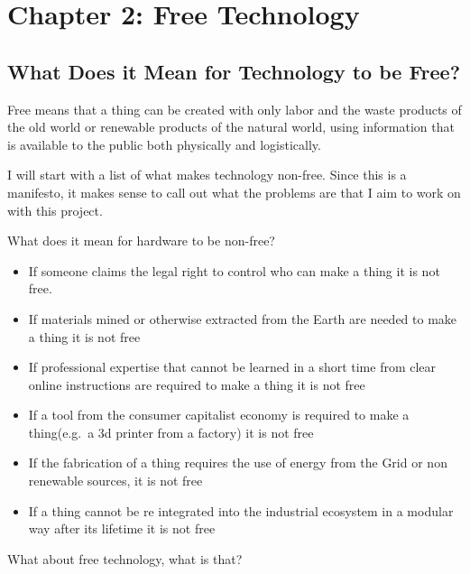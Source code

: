 \section{Chapter 2: Free Technology}\label{chapter-2-free-technology}

\subsection{What Does it Mean for Technology to be
Free?}\label{what-does-it-mean-for-technology-to-be-free}

Free means that a thing can be created with only labor and the waste
products of the old world or renewable products of the natural world,
using information that is available to the public both physically and
logistically.

I will start with a list of what makes technology non-free. Since this
is a manifesto, it makes sense to call out what the problems are that I
aim to work on with this project.

What does it mean for hardware to be non-free?

\begin{itemize}
\item
  If someone claims the legal right to control who can make a thing it
  is not free.
\item
  If materials mined or otherwise extracted from the Earth are needed to
  make a thing it is not free
\item
  If professional expertise that cannot be learned in a short time from
  clear online instructions are required to make a thing it is not free
\item
  If a tool from the consumer capitalist economy is required to make a
  thing(e.g.~a 3d printer from a factory) it is not free
\item
  If the fabrication of a thing requires the use of energy from the Grid
  or non renewable sources, it is not free
\item
  If a thing cannot be re integrated into the industrial ecosystem in a
  modular way after its lifetime it is not free
\end{itemize}

What about free technology, what is that?

